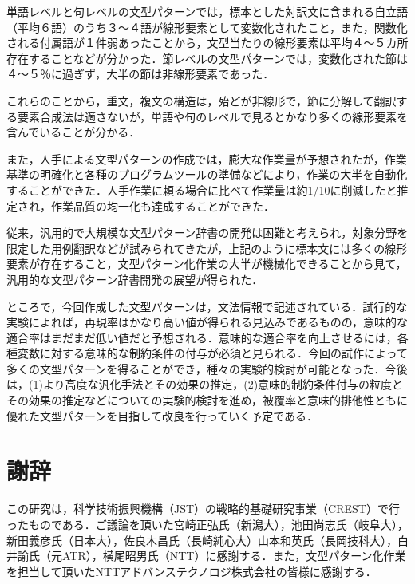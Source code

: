 \documentclass{nlp}
\begin{document}
単語レベルと句レベルの文型パターンでは，標本とした対訳文に含まれる自立語（平均６語）のうち３〜４語が線形要素として変数化されたこと，また，関数化される付属語が１件弱あったことから，文型当たりの線形要素は平均４〜５カ所存在することなどが分かった．節レベルの文型パターンでは，変数化された節は４〜５％に過ぎず，大半の節は非線形要素であった．

これらのことから，重文，複文の構造は，殆どが非線形で，節に分解して翻訳する要素合成法は適さないが，単語や句のレベルで見るとかなり多くの線形要素を含んでいることが分かる．

また，人手による文型パターンの作成では，膨大な作業量が予想されたが，作業基準の明確化と各種のプログラムツールの準備などにより，作業の大半を自動化することができた．人手作業に頼る場合に比べて作業量は約1/10に削減したと推定され，作業品質の均一化も達成することができた．

従来，汎用的で大規模な文型パターン辞書の開発は困難と考えられ，対象分野を限定した用例翻訳などが試みられてきたが，上記のように標本文には多くの線形要素が存在すること，文型パターン化作業の大半が機械化できることから見て，汎用的な文型パターン辞書開発の展望が得られた．

ところで，今回作成した文型パターンは，文法情報で記述されている．試行的な実験によれば，再現率はかなり高い値が得られる見込みであるものの，意味的な適合率はまだまだ低い値だと予想される．意味的な適合率を向上させるには，各種変数に対する意味的な制約条件の付与が必須と見られる．今回の試作によって多くの文型パターンを得ることができ，種々の実験的検討が可能となった．今後は，(1)より高度な汎化手法とその効果の推定，(2)意味的制約条件付与の粒度とその効果の推定などについての実験的検討を進め，被覆率と意味的排他性ともに優れた文型パターンを目指して改良を行っていく予定である．



\section*{謝辞}

この研究は，科学技術振興機構（JST）の戦略的基礎研究事業（CREST）で行ったものである．ご議論を頂いた宮崎正弘氏（新潟大），池田尚志氏（岐阜大），新田義彦氏（日本大），佐良木昌氏（長崎純心大）山本和英氏（長岡技科大），白井諭氏（元ATR），横尾昭男氏（NTT）に感謝する．また，文型パターン化作業を担当して頂いたNTTアドバンステクノロジ株式会社の皆様に感謝する．
\end{document}
